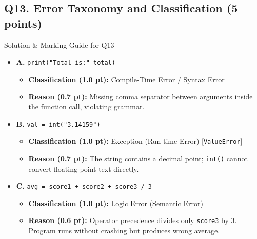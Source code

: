 \documentclass[11pt,a4paper]{article}
\begin{document}
\vspace{0.2cm}

\subsection*{Q13. Error Taxonomy and Classification (5 points)}
\begin{solbox}{Solution \& Marking Guide for Q13}
\begin{itemize}
  \item \textbf{A.} \texttt{print("Total is:" total)}
  \begin{itemize}[noitemsep]
    \item \textbf{Classification (1.0 pt):} Compile-Time Error / Syntax Error
    \item \textbf{Reason (0.7 pt):} Missing comma separator between arguments inside the function call, violating grammar.
  \end{itemize}
  \item \textbf{B.} \texttt{val = int("3.14159")}
  \begin{itemize}[noitemsep]
    \item \textbf{Classification (1.0 pt):} Exception (Run-time Error) [\texttt{ValueError}]
    \item \textbf{Reason (0.7 pt):} The string contains a decimal point; \texttt{int()} cannot convert floating-point text directly.
  \end{itemize}
  \item \textbf{C.} \texttt{avg = score1 + score2 + score3 / 3}
  \begin{itemize}[noitemsep]
    \item \textbf{Classification (1.0 pt):} Logic Error (Semantic Error)
    \item \textbf{Reason (0.6 pt):} Operator precedence divides only \texttt{score3} by 3. Program runs without crashing but produces wrong average.
  \end{itemize}
\end{itemize}
\end{solbox}

\vspace{0.2cm}
\end{document}
